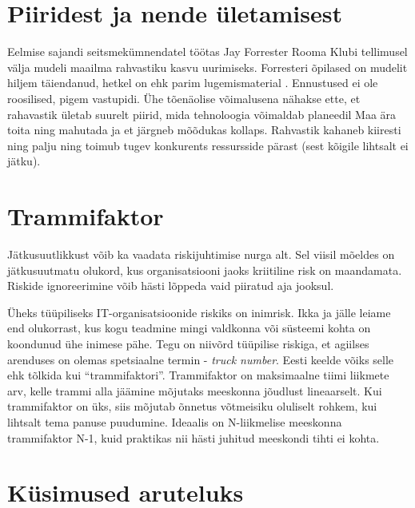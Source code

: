 \documentclass{tufte-book}
\begin{document}
\section{Piiridest ja nende ületamisest}
Eelmise sajandi seitsmekümnendatel töötas Jay Forrester Rooma Klubi tellimusel välja mudeli maailma rahvastiku kasvu uurimiseks. Forresteri õpilased on mudelit hiljem täiendanud, hetkel on ehk parim lugemismaterial \cite{meadows1992beyond}. Ennustused ei ole roosilised, pigem vastupidi. Ühe tõenäolise võimalusena nähakse ette, et rahavastik ületab suurelt piirid, mida tehnoloogia võimaldab planeedil Maa ära toita ning mahutada ja et järgneb mõõdukas kollaps. Rahvastik kahaneb kiiresti ning palju ning toimub tugev konkurents ressursside pärast (sest kõigile lihtsalt ei jätku). 

\section{Trammifaktor}
Jätkusuutlikkust võib ka vaadata riskijuhtimise nurga alt. Sel viisil mõeldes on jätkusuutmatu olukord, kus organisatsiooni jaoks kriitiline risk on maandamata. Riskide ignoreerimine võib hästi lõppeda vaid piiratud aja jooksul.

Üheks tüüpiliseks IT-organisatsioonide riskiks on inimrisk. Ikka ja jälle leiame end olukorrast, kus kogu teadmine mingi valdkonna või süsteemi kohta on koondunud ühe inimese pähe. Tegu on niivõrd tüüpilise riskiga, et agiilses arenduses on olemas spetsiaalne termin - \emph{truck number}\cite{coplien2004organizational}. Eesti keelde võiks selle ehk tõlkida kui \enquote{trammifaktori}. Trammifaktor on maksimaalne tiimi liikmete arv, kelle trammi alla jäämine mõjutaks meeskonna jõudlust lineaarselt. Kui trammifaktor on üks, siis mõjutab õnnetus võtmeisiku oluliselt rohkem, kui lihtsalt tema panuse puudumine. Ideaalis on N-liikmelise meeskonna trammifaktor N-1, kuid praktikas nii hästi juhitud meeskondi tihti ei kohta. 

\section{Küsimused aruteluks}
\end{document}
